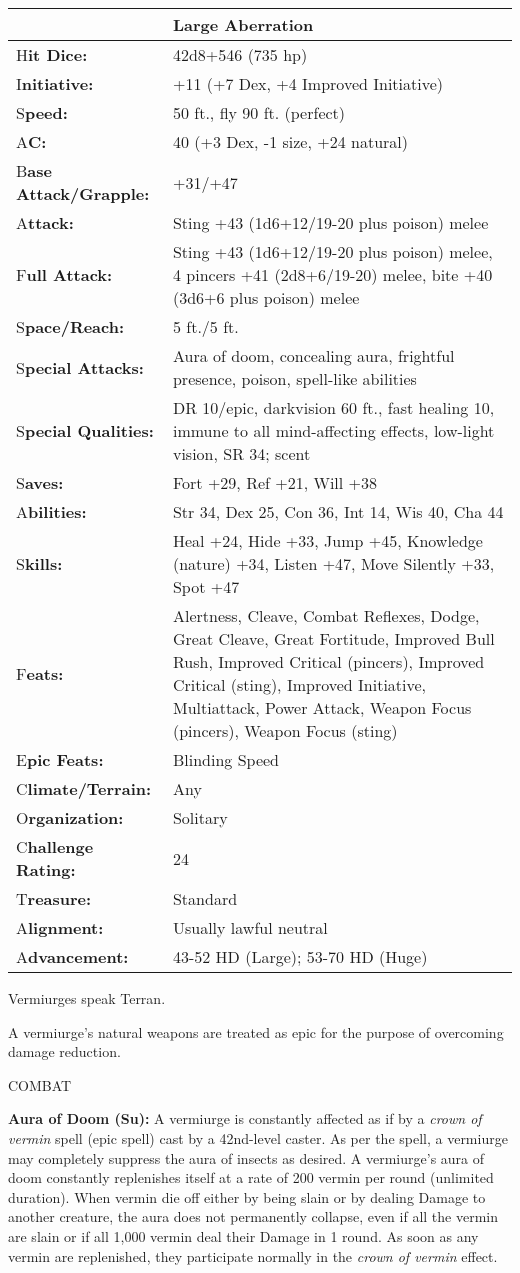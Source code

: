 \documentclass{article}
\begin{document}
{\begin{tabular}{|>{\raggedright}p{66pt}|>{\raggedright}p{259pt}|}
\hline
  & Large Aberration \tabularnewline
\hline
H\textbf{it Dice:} & 42d8+546 (735 hp) \tabularnewline
\hline
I\textbf{nitiative:} & +11 (+7 Dex, +4 Improved Initiative) \tabularnewline
\hline
S\textbf{peed:} & 50 ft., fly 90 ft. (perfect) \tabularnewline
\hline
A\textbf{C:} & 40 (+3 Dex, -1 size, +24 natural) \tabularnewline
\hline
B\textbf{ase Attack/Grapple:} & +31/+47\tabularnewline
\hline
A\textbf{ttack:} & Sting +43 (1d6+12/19-20 plus poison) melee\tabularnewline
\hline
F\textbf{ull Attack:} & Sting +43 (1d6+12/19-20 plus poison) melee, 4 pincers +41 
(2d8+6/19-20) melee, bite +40 (3d6+6 plus poison) melee\tabularnewline
\hline
S\textbf{pace/Reach:} & 5 ft./5 ft.\tabularnewline
\hline
S\textbf{pecial Attacks:} & Aura of doom, concealing aura, frightful presence, 
poison, spell-like abilities \tabularnewline
\hline
S\textbf{pecial Qualities:} & DR 10/epic, darkvision 60 ft., fast healing 10, immune 
to all mind-affecting effects, low-light vision, SR 34; scent \tabularnewline
\hline
S\textbf{aves:} & Fort +29, Ref +21, Will +38 \tabularnewline
\hline
A\textbf{bilities:} & Str 34, Dex 25, Con 36, Int 14, Wis 40, Cha 44 \tabularnewline
\hline
S\textbf{kills:} & Heal +24, Hide +33, Jump +45, Knowledge (nature) +34, Listen 
+47, Move Silently +33, Spot +47\tabularnewline
\hline
F\textbf{eats:} & Alertness, Cleave, Combat Reflexes, Dodge, Great Cleave, Great 
Fortitude, Improved Bull Rush, Improved Critical (pincers), Improved Critical (sting), 
Improved Initiative, Multiattack, Power Attack, Weapon Focus (pincers), Weapon 
Focus (sting) \tabularnewline
\hline
E\textbf{pic Feats:} & Blinding Speed\tabularnewline
\hline
C\textbf{limate/Terrain:} & Any \tabularnewline
\hline
O\textbf{rganization:} & Solitary \tabularnewline
\hline
C\textbf{hallenge Rating:} & 24 \tabularnewline
\hline
T\textbf{reasure:} & Standard \tabularnewline
\hline
A\textbf{lignment:} & Usually lawful neutral\tabularnewline
\hline
A\textbf{dvancement:} & 43-52 HD (Large); 53-70 HD (Huge) \tabularnewline
\hline
\end{tabular}

Vermiurges speak Terran. 

A vermiurge's natural weapons are treated as epic for the purpose of overcoming 
damage reduction.

COMBAT 

\textbf{Aura of Doom (Su):} A vermiurge is constantly affected as if by a \textit{crown 
of vermin }spell (epic spell) cast by a 42nd-level caster. As per the spell, a 
vermiurge may completely suppress the aura of insects as desired. A vermiurge's 
aura of doom constantly replenishes itself at a rate of 200 vermin per round (unlimited 
duration). When vermin die off either by being slain or by dealing Damage to another 
creature, the aura does not permanently collapse, even if all the vermin are slain 
or if all 1,000 vermin deal their Damage in 1 round. As soon as any vermin are 
replenished, they participate normally in the \textit{crown of vermin }effect. 

}
\end{document}

